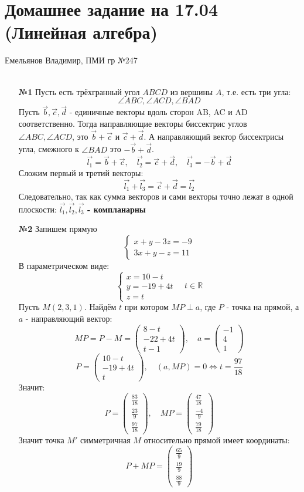\documentclass[a4paper]{article}
\newcommand{\mat}[1]{\begin{pmatrix} #1 \end{pmatrix}}
\renewcommand{\f}[2]{\frac{#1}{#2}}
\newcommand{\case}[1]{\begin{cases} #1 \end{cases}}
\newcommand{\lr}{\Leftrightarrow}
\newcommand{\RR}{\mathbb{R}}
\begin{document}
\section*{Домашнее задание на 17.04 (Линейная алгебра)}
 {\large Емельянов Владимир, ПМИ гр №247}\\\\
\begin{enumerate}
    \item[\textbf{№1}]Пусть есть трёхгранный угол $ABCD$ из вершины $A$, т.е. есть три угла: 
    $$\angle ABC, \angle ACD, \angle BAD$$
    Пусть $\vec{b}, \vec{c}, \vec{d}$ - единичные векторы вдоль сторон AB, AC и AD соответственно.
    Тогда направляющие векторы биссектрис углов $\angle ABC, \angle ACD$, это $\vec{b}+ \vec{c}$ и $ \vec{c}+\vec{d}$.
    А направляющий вектор биссектрисы угла, смежного к $\angle BAD$ это $-\vec{b}+\vec{d}$.
    $$\vec{l_1} = \vec{b}+ \vec{c}, \quad \vec{l_2} = \vec{c}+\vec{d}, \quad \vec{l_3} = -\vec{b}+\vec{d}$$
    Сложим первый и третий векторы:
    $$\vec{l_1} + \vec{l_3 } =  \vec{c}+\vec{d} = \vec{l_2}$$
    Следовательно, так как сумма векторов и сами векторы точно лежат в одной плоскости:
     \textbf{$\vec{l_1}, \vec{l_2}, \vec{l_3}$ - компланарны}\\


    \item[\textbf{№2}]Запишем прямую
    $$\case{
        x + y - 3z = -9\\
        3x+y-z=11
    }$$
    В параметрическом виде:
    $$\case{
        x = 10 - t\\
        y = -19 + 4t\\
        z = t
    } \quad t\in \RR$$
    Пусть $M(2, 3, 1)$. Найдём $t$ при котором $MP \perp a$, где $P$ - точка на прямой, а $a$ - направляющий вектор:
    $$MP = P-M = \mat{8-t\\-22+4t\\t-1}, \quad a = \mat{-1\\4\\1}$$
    $$P = \mat{10-t\\-19+4t\\t}, \quad (a, MP) = 0 \lr t = \f{97}{18}$$
    Значит:
    $$P = \begin{pmatrix} \frac{83}{18}\\ \frac{23}{9}\\ \frac{97}{18} \end{pmatrix}, \quad MP = \mat{\frac{47}{18}\\ \frac{-4}{9}\\ \frac{79}{18}}$$
    Значит точка $M'$ симметричная $M$ относительно прямой имеет координаты:
    $$P + MP = \begin{pmatrix} \frac{65}{9} \\ \frac{19}{9} \\ \frac{88}{9} \end{pmatrix}$$   


\end{enumerate}
\end{document}

